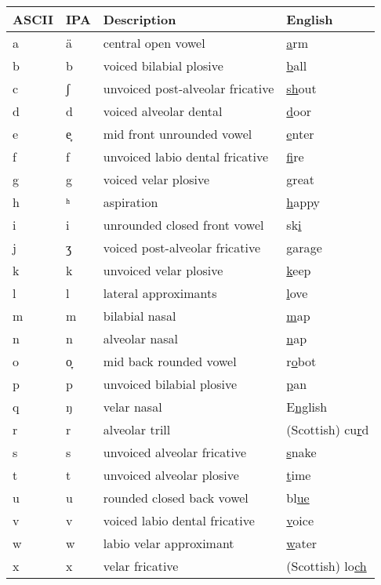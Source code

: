 \begin{table}
  \begin{tabular}{llll}
ASCII&IPA&Description&English\\
    \midrule{}
a & {\uni{} ä} & central open vowel &\underline{a}rm\\
b & {\uni{} b} & voiced bilabial plosive &\underline{b}all\\
c & {\uni{} ʃ} & unvoiced post-alveolar fricative & \underline{sh}out\\
d & {\uni{} d} & voiced alveolar dental&\underline{d}oor\\
e & {\uni{} e̞} & mid front unrounded vowel&\underline{e}nter\\
f & {\uni{} f} & unvoiced labio dental fricative&\underline{f}ire\\
g & {\uni{} g} & voiced velar plosive&\underline{g}reat\\
h & {\uni{} ʰ} & aspiration&\underline{h}appy\\
i & {\uni{} i} & unrounded closed front vowel&sk\underline{i}\\
j & {\uni{} ʒ} & voiced post-alveolar fricative&gara\underline{g}e\\
k & {\uni{} k} & unvoiced velar plosive&\underline{k}eep\\
l & {\uni{} l} & lateral approximants&\underline{l}ove\\
m & {\uni{} m} & bilabial nasal&\underline{m}ap\\
n & {\uni{} n} & alveolar nasal&\underline{n}ap\\
o & {\uni{} o̞} & mid back rounded vowel&r\underline{o}bot\\
p & {\uni{} p} & unvoiced bilabial plosive&\underline{p}an\\
q & {\uni{} ŋ} & velar nasal&E\underline{ng}lish\\
r & {\uni{} r} & alveolar trill& (Scottish) cu\underline{r}d\\
s & {\uni{} s} & unvoiced alveolar fricative & \underline{s}nake\\
t & {\uni{} t} & unvoiced alveolar plosive & \underline{t}ime \\
u & {\uni{} u} & rounded closed back vowel & bl\underline{ue}\\
v & {\uni{} v} & voiced labio dental fricative & \underline{v}oice\\
w & {\uni{} w} & labio velar approximant & \underline{w}ater\\
x & {\uni{} x} & velar fricative& (Scottish) lo\underline{ch}\\

\end{tabular}
\end{table}
